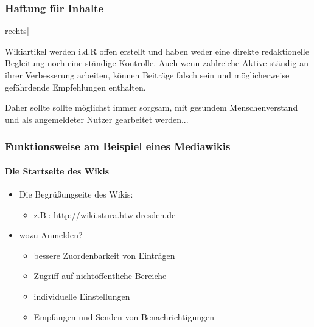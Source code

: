 \documentclass{beamer}
\begin{document}
\begin{frame}
  \frametitle{Haftung für Inhalte}
  
  \href{media/}{rechts|}
  
  Wikiartikel werden
  i.d.R offen erstellt und haben weder eine direkte redaktionelle
  Begleitung noch eine ständige Kontrolle. Auch wenn zahlreiche Aktive
  ständig an ihrer Verbesserung arbeiten, können Beiträge falsch sein und
  möglicherweise gefährdende Empfehlungen enthalten.

  Daher sollte sollte möglichst immer sorgsam, mit gesundem
  Menschenverstand und als angemeldeter Nutzer gearbeitet werden...
\end{frame}


\begin{frame}
  \frametitle{Funktionsweise am Beispiel eines Mediawikis}
  \framesubtitle{Die Startseite des Wikis}

  \begin{itemize}
    \item Die Begrüßungseite des Wikis:

    \begin{itemize}
      \item z.B.: \url{http://wiki.stura.htw-dresden.de}
    \end{itemize}
    \item wozu Anmelden?

    \begin{itemize}
      \item bessere Zuordenbarkeit von Einträgen
      \item Zugriff auf nichtöffentliche Bereiche
      \item individuelle Einstellungen
      \item Empfangen und Senden von Benachrichtigungen
    \end{itemize}
  \end{itemize}
\end{frame}
\end{document}
